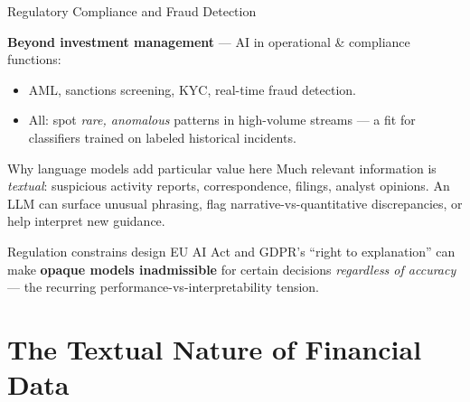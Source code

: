 \documentclass[9pt,t]{beamer}
\begin{document}
\begin{frame}{Regulatory Compliance and Fraud Detection}

\textbf{Beyond investment management} --- AI in operational \& compliance functions:
\begin{itemize}
  \item AML, sanctions screening, KYC, real-time fraud detection.
  \item All: spot \emph{rare, anomalous} patterns in high-volume streams ---
        a fit for classifiers trained on labeled historical incidents.
\end{itemize}

\medskip
\begin{block}{Why language models add particular value here}
Much relevant information is \emph{textual}: suspicious activity reports,
correspondence, filings, analyst opinions. An LLM can surface unusual phrasing,
flag narrative-vs-quantitative discrepancies, or help interpret new guidance.
\end{block}

\medskip
\begin{alertblock}{Regulation constrains design}
EU AI Act and GDPR's ``right to explanation'' can make \textbf{opaque models
inadmissible} for certain decisions \emph{regardless of accuracy} --- the
recurring performance-vs-interpretability tension.
\end{alertblock}
\end{frame}

\section{The Textual Nature of Financial Data}
\end{document}
